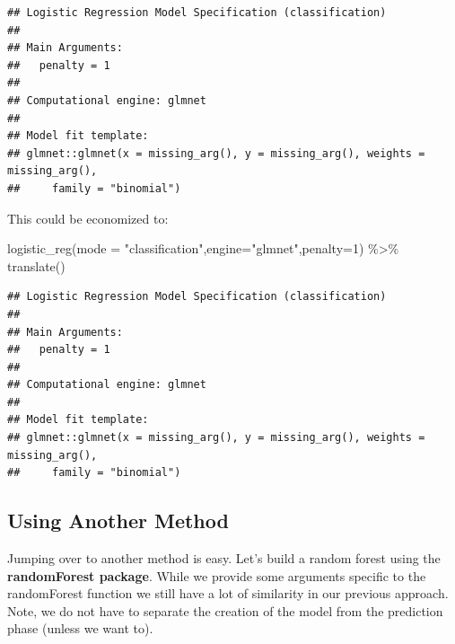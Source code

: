 \documentclass[
]{article}
\newenvironment{Shaded}{\begin{snugshade}}{\end{snugshade}}
\newcommand{\AttributeTok}[1]{\textcolor[rgb]{0.77,0.63,0.00}{#1}}
\newcommand{\DecValTok}[1]{\textcolor[rgb]{0.00,0.00,0.81}{#1}}
\newcommand{\FunctionTok}[1]{\textcolor[rgb]{0.00,0.00,0.00}{#1}}
\newcommand{\NormalTok}[1]{#1}
\newcommand{\SpecialCharTok}[1]{\textcolor[rgb]{0.00,0.00,0.00}{#1}}
\newcommand{\StringTok}[1]{\textcolor[rgb]{0.31,0.60,0.02}{#1}}
\begin{document}
\begin{verbatim}
## Logistic Regression Model Specification (classification)
## 
## Main Arguments:
##   penalty = 1
## 
## Computational engine: glmnet 
## 
## Model fit template:
## glmnet::glmnet(x = missing_arg(), y = missing_arg(), weights = missing_arg(), 
##     family = "binomial")
\end{verbatim}

This could be economized to:

\begin{Shaded}
\begin{Highlighting}[]
\FunctionTok{logistic\_reg}\NormalTok{(}\AttributeTok{mode =} \StringTok{"classification"}\NormalTok{,}\AttributeTok{engine=}\StringTok{"glmnet"}\NormalTok{,}\AttributeTok{penalty=}\DecValTok{1}\NormalTok{) }\SpecialCharTok{\%\textgreater{}\%} 
  \FunctionTok{translate}\NormalTok{()}
\end{Highlighting}
\end{Shaded}

\begin{verbatim}
## Logistic Regression Model Specification (classification)
## 
## Main Arguments:
##   penalty = 1
## 
## Computational engine: glmnet 
## 
## Model fit template:
## glmnet::glmnet(x = missing_arg(), y = missing_arg(), weights = missing_arg(), 
##     family = "binomial")
\end{verbatim}

\hypertarget{using-another-method}{%
\subsection{Using Another Method}\label{using-another-method}}

Jumping over to another method is easy. Let's build a random forest
using the \textbf{randomForest package}. While we provide some arguments
specific to the randomForest function we still have a lot of similarity
in our previous approach. Note, we do not have to separate the creation
of the model from the prediction phase (unless we want to).
\end{document}

